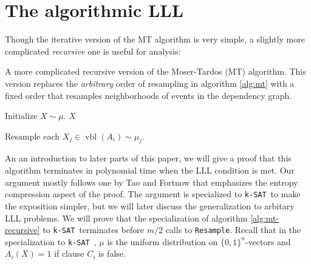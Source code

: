 \documentclass{article}
\newcommand{\ksat}{\texttt{k-SAT}~}
\newcommand{\hasDist}%
  {\sim}
\begin{document}
\section{The algorithmic LLL}
\label{sec:lll}
Though the iterative version of the MT algorithm is very simple, a slightly more complicated \emph{recursive} one is useful for analysis:

\begin{algorithm}[H]
\caption{A more complicated recursive version of the Moser-Tardos (MT) algorithm.  This version replaces the \emph{arbitrary} order of resampling in algorithm \ref{alg:mt} with a fixed order that resamples neighborhoods of events in the dependency graph.}
\label{alg:mt-recursive}
\begin{algorithmic}
  \State Initialize $X \hasDist \mu$.
  \EndFor
  \Return $X$
\EndFunction

    \Return
  \EndIf
  \State {}
  \EndFor
\EndFunction

  \State Resample each $X_j \in \operatorname{vbl}(A_i) \hasDist \mu_j$.
\EndFunction

\end{algorithmic}
\end{algorithm}

An an introduction to later parts of this paper, we will give a proof that this algorithm terminates in polynomial time when the LLL condition is met.  Our argument mostly follows one by Tao \cite{tao2009entropy} and Fortnow \cite{fortnow2009entropy} that emphasizes the entropy compression aspect of the proof.  The argument is specialized to \ksat to make the exposition simpler, but we will later discuss the generalization to arbitary LLL problems.  We will prove that the specialization of algorithm \ref{alg:mt-recursive} to \ksat terminates before $m/2$ calls to \texttt{Resample}. %
Recall that in the specialization to \ksat, $\mu$ is the uniform distribution on $\{0,1\}^n$-vectors and $A_i(X) = 1$ if clause $C_i$ is false.

\end{document}
